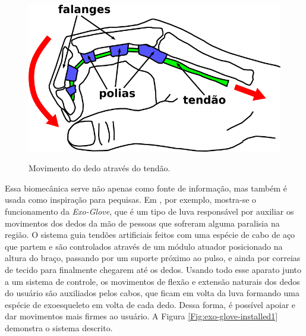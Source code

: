 \documentclass[
	12pt,				%
	openright,			%
	oneside,			%
	a4paper,			%
	english,			%
	brazil				%
	]{abntex2}
\begin{document}
		\begin{figure}[h!]
			\centering
  		\caption{Movimento do dedo através do tendão.}
  		\includegraphics[scale=0.35]{./figures/hand-tendon-flex1.png}
  		\label{Fig:hand-tendon-flex1}
		\end{figure}

		Essa biomecânica serve não apenas como fonte de informação, mas também é usada como inspiração para pequisas. Em \cite{hyunki2015exoglove}, por exemplo, mostra-se o funcionamento da \textit{Exo-Glove}, que é um tipo de luva responsável por auxiliar os movimentos dos dedos da mão de pessoas que sofreram alguma paralisia na região. O sistema guia tendões artificiais feitos com uma espécie de cabo de aço que partem e são controlados através de um módulo atuador posicionado na altura do braço, passando por um suporte próximo ao pulso, e ainda por correias de tecido para finalmente chegarem até os dedos. Usando todo esse aparato junto a um sistema de controle, os movimentos de flexão e extensão naturais dos dedos do usuário são auxiliados pelos cabos, que ficam em volta da luva formando uma espécie de exoesqueleto em volta de cada dedo. Dessa forma, é possível apoiar e dar movimentos mais firmes ao usuário. A Figura \ref{Fig:exo-glove-installed1} demonstra o sistema descrito.
\end{document}
